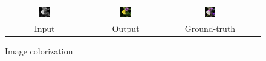 \documentclass[10pt,twocolumn,letterpaper]{article}
\def\acollumsize{0.14\textwidth}
\begin{document}
\begin{figure}[t!]
\begin{center}
\begin{tabular}{ cccc }
\includegraphics[width=\acollumsize]{img/result/3_in.JPEG}&
\includegraphics[width=\acollumsize]{img/result/3.png}&
\includegraphics[width=\acollumsize]{img/result/3_gt.JPEG}& \\

Input & Output & Ground-truth \\

\end{tabular}
\vspace{-2mm}
\caption{\small Image colorization}
\label{fig:result}
\end{center}
\end{figure}
\end{document}
